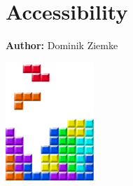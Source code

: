 \chapter{Accessibility }
\label{ch:accessibility}

\hfill \textbf{Author:} Dominik Ziemke

\begin{center} \includegraphics[width=0.25\textwidth, angle=0]{figures/MATSimBook.png} \end{center}


